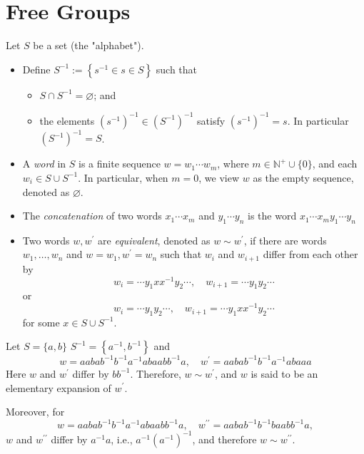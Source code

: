 \section{Free Groups}
\begin{definition}
Let \(S\) be a set (the "alphabet"). 
\begin{itemize}
\item Define \({S}^{-1} \mathrel{\text{ := }} \left\{  {s^{-1} \in  s \in  S}\right\}\) such that
\begin{itemize}
    \item \(S \cap  {S}^{-1} = \varnothing\); and
    \item the elements $(s^{-1})^{-1} \in (S^{-1})^{-1}$ satisfy \({\left( {s}^{-1}\right) }^{-1} = s\). In particular $(S^{-1})^{-1} = S$.
\end{itemize}
\item A \emph{word} in \(S\) is a finite sequence \(w = {w}_{1}\cdots {w}_{m}\), where \(m \in  {\mathbb{N}}^{ + } \cup  \{ 0\}\), and each \({w}_{i}  \in  S \cup  {S}^{-1}\). In particular, when \(m = 0\), we view \(w\) as the empty sequence, denoted as \(\varnothing\).

\item The \emph{concatenation} of two words \({x}_{1}\cdots {x}_{m}\) and \({y}_{1}\cdots {y}_{n}\) is the word \({x}_{1}\cdots {x}_{m}{y}_{1}\cdots {y}_{n}\)

\item Two words \(w,{w}^{\prime }\) are \emph{equivalent}, denoted as \(w \sim  {w}^{\prime }\), if there are words \({w}_{1},\ldots,{w}_{n}\) and \(w = {w}_{1},{w}^{\prime } = {w}_{n}\) such that $w_i$ and $w_{i+1}$ differ from each other by
\[
{w}_{i} = \cdots {y}_{1}x{x}^{-1}{y}_{2}\cdots,\quad {w}_{i + 1} = \cdots {y}_{1}{y}_{2}\cdots
\]
or
\[
{w}_{i} = \cdots {y}_{1}{y}_{2}\cdots,\quad {w}_{i + 1} = \cdots {y}_{1}x{x}^{-1}{y}_{2}\cdots
\]
for some \(x \in  S \cup  {S}^{-1}\).
\end{itemize}
\end{definition}

\begin{example} Let \(S = \{ a,b\}\) \({S}^{-1} = \left\{  {{a}^{-1}, {b}^{-1}}\right\}\) and
\[
w = {aaba}{b}^{-1}{b}^{-1}{a}^{-1}{abaab}{b}^{-1}a,
\quad {w}^{\prime } = {aaba}{b}^{-1}{b}^{-1}{a}^{-1}{abaaa}
\]
Here \(w\) and \({w}^{\prime }\) differ by \(b{b}^{-1}\). Therefore, \(w \sim  {w}^{\prime }\), and \(w\) is said to be an elementary expansion of \({w}^{\prime }\).

Moreover, for
\[
w = {aaba}{b}^{-1}{b}^{-1}{a}^{-1}{abaab}{b}^{-1}a, \quad {w}^{\prime \prime } = {aaba}{b}^{-1}{b}^{-1}{baab}{b}^{-1}a,
\]
\(w\) and \({w}^{\prime \prime }\) differ by \({a}^{-1}a\), i.e., \({a}^{-1}{\left( {a}^{-1}\right) }^{-1}\), and therefore \(w \sim  {w}^{\prime \prime }\).
\end{example}


